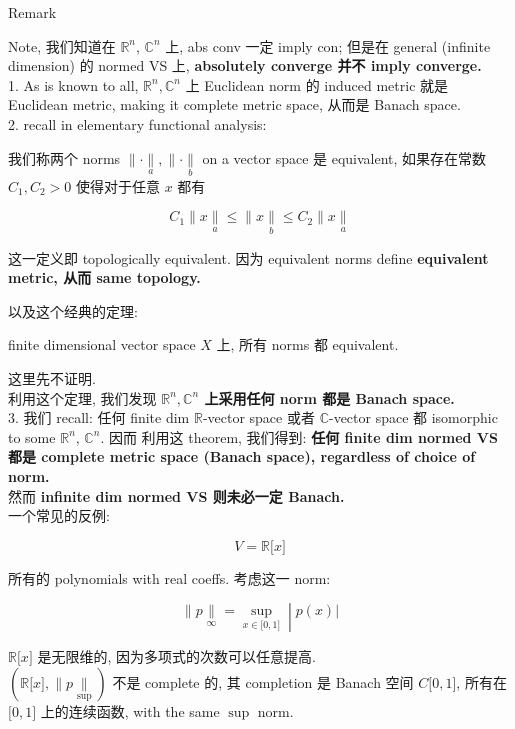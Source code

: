 \documentclass{qlnotes-export}
\begin{document}
\begin{qlremark}{Remark}

Note, 我们知道在 \({\mathbb{R}}^{n}\), \({\mathbb{C}}^{n}\) 上, abs conv 一定 imply con; 但是在 general (infinite dimension) 的 normed VS 上, \textbf{absolutely converge 并不 imply converge.}\\
1. As is known to all, \({\mathbb{R}}^{n},{\mathbb{C}}^{n}\) 上 Euclidean norm 的 induced metric 就是 Euclidean metric, making it complete metric space, 从而是 Banach space.\\
2. recall in elementary functional analysis:

\begin{definition}

我们称两个 norms \(\parallel \cdot \underset{a}{\parallel}, \parallel \cdot \underset{b}{\parallel}\) on a vector space 是 equivalent, 如果存在常数 \(C_{1},C_{2} > 0\) 使得对于任意 \(x\) 都有

\[C_{1} \parallel x\underset{a}{\parallel} \leq \parallel x\underset{b}{\parallel} \leq C_{2} \parallel x\underset{a}{\parallel}\]

这一定义即 topologically equivalent. 因为 equivalent norms define \textbf{equivalent metric, 从而 same topology.}

\end{definition}

以及这个经典的定理:

\begin{theorem}

finite dimensional vector space \(X\) 上, 所有 norms 都 equivalent.

\end{theorem}

这里先不证明.\\
利用这个定理, 我们发现 \textbf{\({\mathbb{R}}^{n},{\mathbb{C}}^{n}\) 上采用任何 norm 都是 Banach space.}\\
3. 我们 recall: 任何 finite dim \(\mathbb{R}\)-vector space 或者 \(\mathbb{C}\)-vector space 都 isomorphic to some \({\mathbb{R}}^{n}\), \({\mathbb{C}}^{n}\). 因而 利用这 theorem, 我们得到: \textbf{任何 finite dim normed VS 都是 complete metric space (Banach space), regardless of choice of norm.}\\
然而 \textbf{infinite dim normed VS 则未必一定 Banach.}\\
一个常见的反例:

\[V = {\mathbb{R}}\lbrack x\rbrack\]

所有的 polynomials with real coeffs. 考虑这一 norm:

\[\left. \parallel p\underset{\infty}{\parallel} = \sup\limits_{x \in \lbrack 0,1\rbrack} \middle| p(x)| \right.\]

\({\mathbb{R}}\lbrack x\rbrack\) 是无限维的, 因为多项式的次数可以任意提高.\\
\(({\mathbb{R}}\lbrack x\rbrack, \parallel p\underset{\sup}{\parallel})\) 不是 complete 的, 其 completion 是 Banach 空间 \(C\lbrack 0,1\rbrack\), 所有在 \(\lbrack 0,1\rbrack\) 上的连续函数, with the same \(\sup\) norm.\\

\end{qlremark}
\end{document}
